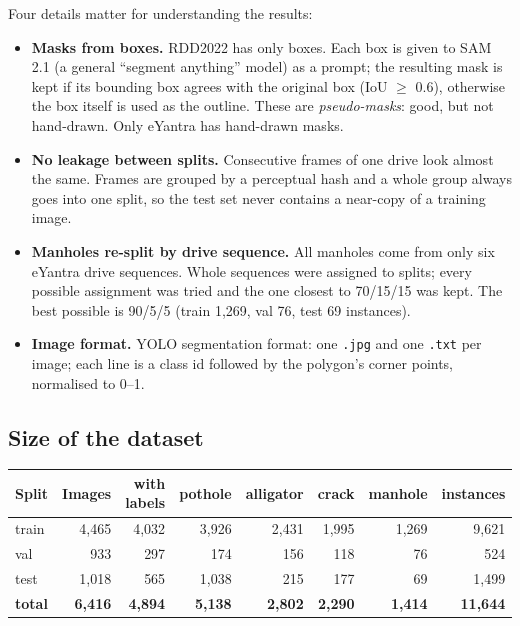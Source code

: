 \documentclass[11pt,a4paper]{article}
\newcommand{\code}[1]{\texttt{\small #1}}
\begin{document}
Four details matter for understanding the results:
\begin{itemize}
  \item \textbf{Masks from boxes.} RDD2022 has only boxes. Each box is given to SAM 2.1 (a general ``segment
        anything'' model) as a prompt; the resulting mask is kept if its bounding box agrees with the original box
        (IoU $\ge$ 0.6), otherwise the box itself is used as the outline. These are \emph{pseudo-masks}: good, but not
        hand-drawn. Only eYantra has hand-drawn masks.
  \item \textbf{No leakage between splits.} Consecutive frames of one drive look almost the same. Frames are grouped by
        a perceptual hash and a whole group always goes into one split, so the test set never contains a near-copy of
        a training image.
  \item \textbf{Manholes re-split by drive sequence.} All manholes come from only six eYantra drive sequences. Whole
        sequences were assigned to splits; every possible assignment was tried and the one closest to 70/15/15 was
        kept. The best possible is 90/5/5 (train 1,269, val 76, test 69 instances).
  \item \textbf{Image format.} YOLO segmentation format: one \code{.jpg} and one \code{.txt} per image; each line is a
        class id followed by the polygon's corner points, normalised to 0--1.
\end{itemize}

\subsection{Size of the dataset}
\begin{center}
\begin{tabular}{@{}l r r r r r r r@{}}
\toprule
\textbf{Split} & \textbf{Images} & \textbf{with labels} & \textbf{pothole} & \textbf{alligator} & \textbf{crack} & \textbf{manhole} & \textbf{instances}\\
\midrule
train & 4,465 & 4,032 & 3,926 & 2,431 & 1,995 & 1,269 & 9,621\\
val   &   933 &   297 &   174 &   156 &   118 &    76 &   524\\
test  & 1,018 &   565 & 1,038 &   215 &   177 &    69 & 1,499\\
\midrule
\textbf{total} & \textbf{6,416} & \textbf{4,894} & \textbf{5,138} & \textbf{2,802} & \textbf{2,290} & \textbf{1,414} & \textbf{11,644}\\
\bottomrule
\end{tabular}
\end{center}
\end{document}
